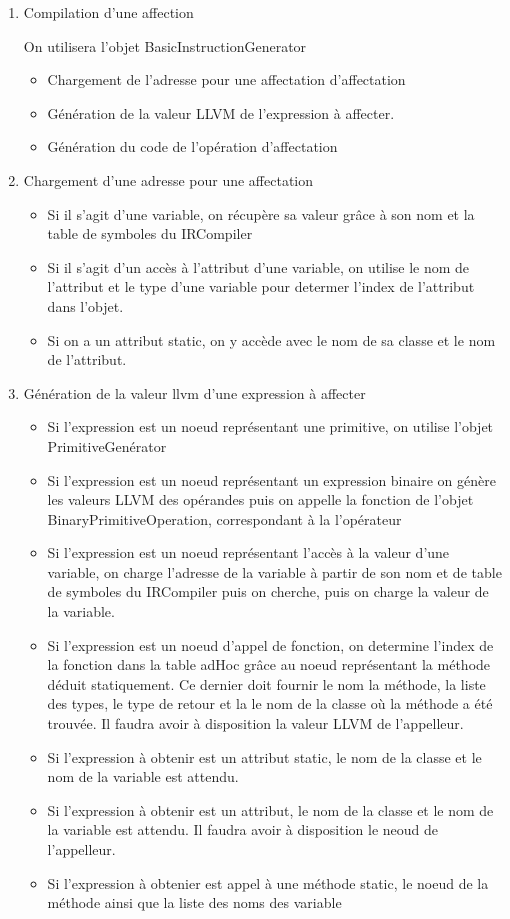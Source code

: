 \documentclass{article}
\begin{document}
\begin{enumerate}
  \item Compilation d'une affection

    On utilisera l'objet BasicInstructionGenerator
   \begin{itemize}
    \item Chargement de l'adresse pour une affectation d'affectation 
    \item Génération de la valeur LLVM de l'expression à affecter.
    \item Génération du code de l'opération d'affectation
   \end{itemize}

  \item Chargement d'une adresse pour une affectation
    \begin{itemize}
     \item Si il s'agit d'une variable, on récupère sa valeur grâce à son nom et la table de symboles du IRCompiler
     \item Si il s'agit d'un accès à l'attribut d'une variable, on utilise le nom de l'attribut et le type d'une variable pour determer l'index de l'attribut dans l'objet.
     \item Si on a un attribut static, on y accède avec le nom de sa classe et le nom de l'attribut.
    \end{itemize}

  \item Génération de la valeur llvm d'une expression à affecter
   \begin{itemize}
    \item Si l'expression est un noeud représentant une primitive, on utilise l'objet PrimitiveGenérator
    \item Si l'expression est un noeud représentant un expression binaire on génère les valeurs LLVM des opérandes
    puis on appelle la fonction de l'objet BinaryPrimitiveOperation, correspondant à la l'opérateur
    \item Si l'expression est un noeud représentant l'accès à la valeur d'une variable, on charge l'adresse de la variable à partir de son nom et de table de symboles du IRCompiler puis on cherche, puis on charge la valeur de la variable.
    \item Si l'expression est un noeud d'appel de fonction, on determine l'index de la fonction dans la table adHoc grâce au noeud représentant la méthode déduit statiquement. Ce dernier doit fournir le nom la méthode, la liste des types, le type de retour et la le nom de la classe où la méthode a été trouvée. Il faudra avoir à disposition la valeur LLVM  de l'appelleur.
    \item Si l'expression à obtenir est un attribut static, le nom de la classe et le nom de la variable est attendu.
    \item Si l'expression à obtenir est un attribut, le nom de la classe et le nom de la variable est attendu. Il faudra avoir à disposition le neoud de l'appelleur.
    \item Si l'expression à obtenier est appel à une méthode static, le noeud de la méthode ainsi que la liste des noms des variable
   \end{itemize}


\end{enumerate}
\end{document}
